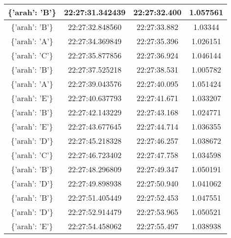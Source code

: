 \begin{longtable}{|ccc|c|}
    \multicolumn{1}{|c|}{\{'arah': 'B'\}} & \multicolumn{1}{c|}{22:27:31.342439} & 22:27:32.400       & 1.057561    \\ \hline
    \multicolumn{1}{|c|}{\{'arah': 'B'\}} & \multicolumn{1}{c|}{22:27:32.848560} & 22:27:33.882       & 1.03344     \\ \hline
    \multicolumn{1}{|c|}{\{'arah': 'A'\}} & \multicolumn{1}{c|}{22:27:34.369849} & 22:27:35.396       & 1.026151    \\ \hline
    \multicolumn{1}{|c|}{\{'arah': 'C'\}} & \multicolumn{1}{c|}{22:27:35.877856} & 22:27:36.924       & 1.046144    \\ \hline
    \multicolumn{1}{|c|}{\{'arah': 'B'\}} & \multicolumn{1}{c|}{22:27:37.525218} & 22:27:38.531       & 1.005782    \\ \hline
    \multicolumn{1}{|c|}{\{'arah': 'A'\}} & \multicolumn{1}{c|}{22:27:39.043576} & 22:27:40.095       & 1.051424    \\ \hline
    \multicolumn{1}{|c|}{\{'arah': 'E'\}} & \multicolumn{1}{c|}{22:27:40.637793} & 22:27:41.671       & 1.033207    \\ \hline
    \multicolumn{1}{|c|}{\{'arah': 'B'\}} & \multicolumn{1}{c|}{22:27:42.143229} & 22:27:43.168       & 1.024771    \\ \hline
    \multicolumn{1}{|c|}{\{'arah': 'E'\}} & \multicolumn{1}{c|}{22:27:43.677645} & 22:27:44.714       & 1.036355    \\ \hline
    \multicolumn{1}{|c|}{\{'arah': 'D'\}} & \multicolumn{1}{c|}{22:27:45.218328} & 22:27:46.257       & 1.038672    \\ \hline
    \multicolumn{1}{|c|}{\{'arah': 'C'\}} & \multicolumn{1}{c|}{22:27:46.723402} & 22:27:47.758       & 1.034598    \\ \hline
    \multicolumn{1}{|c|}{\{'arah': 'B'\}} & \multicolumn{1}{c|}{22:27:48.296809} & 22:27:49.347       & 1.050191    \\ \hline
    \multicolumn{1}{|c|}{\{'arah': 'D'\}} & \multicolumn{1}{c|}{22:27:49.898938} & 22:27:50.940       & 1.041062    \\ \hline
    \multicolumn{1}{|c|}{\{'arah': 'B'\}} & \multicolumn{1}{c|}{22:27:51.405449} & 22:27:52.453       & 1.047551    \\ \hline
    \multicolumn{1}{|c|}{\{'arah': 'D'\}} & \multicolumn{1}{c|}{22:27:52.914479} & 22:27:53.965       & 1.050521    \\ \hline
    \multicolumn{1}{|c|}{\{'arah': 'E'\}} & \multicolumn{1}{c|}{22:27:54.458062} & 22:27:55.497       & 1.038938    \\ \hline

\end{longtable}
